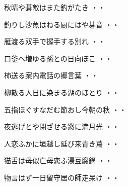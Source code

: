 \vspace{0.6cm}
\begin{shiika}秋晴や碁敵はまた釣がたき
\hfill{・・}\end{shiika}
\vspace{0.6cm}
\begin{shiika}釣りし沙魚はねる厨にはや碁音
\hfill{・・}\end{shiika}
\vspace{0.6cm}
\begin{shiika}雁渡る双手で握手する別れ
\hfill{・・}\end{shiika}
\vspace{0.6cm}
\begin{shiika}口釜へ増ゆる孫との日向ぼこ
\hfill{・・}\end{shiika}
\vspace{0.6cm}
\begin{shiika}柿送る案内電話の郷言葉
\hfill{・・}\end{shiika}
\vspace{0.6cm}
\begin{shiika}柳散る入日に染まる湖のほとり
\hfill{・・}\end{shiika}
\vspace{0.6cm}
\begin{shiika}五指ほぐすなだむ節おし今朝の秋
\hfill{・・}\end{shiika}
\vspace{0.6cm}
\begin{shiika}夜逃げとや閉ざせる窓に満月光
\hfill{・・}\end{shiika}
\vspace{0.6cm}
\begin{shiika}人恋ふかに垣越し延び来青き蔦
\hfill{・・}\end{shiika}
\vspace{0.6cm}
\begin{shiika}猫舌は母似亡母恋ふ湯豆腐鍋
\hfill{・・}\end{shiika}
\vspace{0.6cm}
\begin{shiika}物言はず一日留守居の師走呆け
\hfill{・・}\end{shiika}
